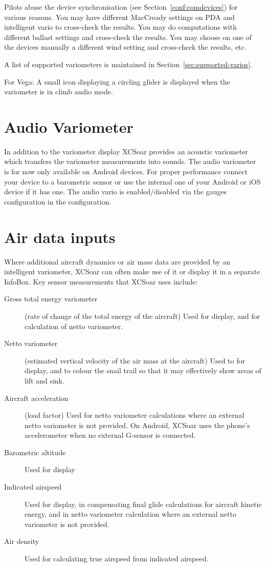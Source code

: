 Pilots abuse the device synchronisation (see Section~\ref{conf:comdevices}) for various
reasons. You may have  different MacCready settings on PDA and intelligent vario
to cross-check the results. You may do computations with different ballast 
settings and cross-check the results. You may choose on one of the devices
manually a different wind setting and cross-check the results, etc.

A list of supported variometers is maintained in
Section~\ref{sec:supported-varios}.

For Vega: A small icon displaying a circling glider is displayed when
the variometer is in climb audio mode.

\section{Audio Variometer}

In addition to the variometer display XCSoar provides an acoustic variometer which transfers the 
variometer measurements into sounds. The audio variometer is for now only available
on Android devices. For proper performance connect your device to a barometric sensor or use the
internal one of your Android or iOS device if it has one.
The audio vario is enabled/disabled via the gauges configuration in the configuration.


\section{Air data inputs}

Where additional aircraft dynamics or air mass data are provided by an
intelligent variometer, XCSoar can often make use of it or display it
in a separate InfoBox.  Key sensor measurements that XCSoar uses include:
\begin{description}
\item[Gross total energy variometer] (rate of change of the total energy of
 the aircraft)  Used for display, and for calculation of netto variometer.
\item[Netto variometer] (estimated vertical velocity of the air mass at
 the aircraft)  Used to for display, and to colour the snail trail
 so that it may effectively show areas of lift and sink.
\item[Aircraft acceleration] (load factor)  Used for netto variometer
  calculations where an external netto variometer is not provided.
  On Android, XCSoar uses the phone's accelerometer when no external
  G-sensor is connected.
\item[Barometric altitude] Used for display
\item[Indicated airspeed] Used for display, in compensating final glide
  calculations for aircraft kinetic energy, and in netto variometer
  calculation where an external netto variometer is not provided.
\item[Air density] Used for calculating true airspeed from indicated
  airspeed.
\end{description}

